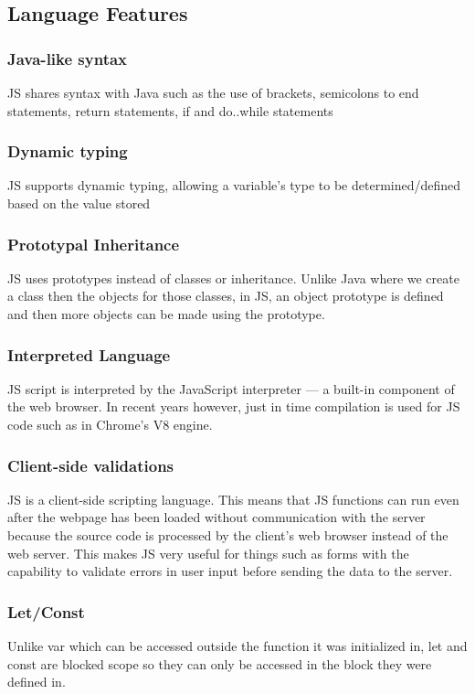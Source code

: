 \documentclass{article}
\begin{document}
  \subsection{Language Features}

  \subsubsection{Java-like syntax}
  JS shares syntax with Java such as the use of brackets, semicolons to end
  statements, return statements, if and do..while statements

  \subsubsection{Dynamic typing}
  JS supports dynamic typing, allowing a variable’s type to be
  determined/defined based on the value stored

  \subsubsection{Prototypal Inheritance}
  JS uses prototypes instead of classes or inheritance. Unlike Java where we
  create a class then the objects for those classes, in JS, an object prototype
  is defined and then more objects can be made using the prototype.

  \subsubsection{Interpreted Language}
  JS script is interpreted by the JavaScript interpreter --- a built-in
  component of the web browser. In recent years however, just in time
  compilation is used for JS code such as in Chrome’s V8 engine.

  \subsubsection{Client-side validations}
  JS is a client-side scripting language. This means that JS functions can run
  even after the webpage has been loaded without communication with the server
  because the source code is processed by the client’s web browser instead of
  the web server. This makes JS very useful for things such as forms with the
  capability to validate errors in user input before sending the data to the
  server.

  \subsubsection{Let/Const}
  Unlike var which can be accessed outside the function it was initialized in,
  let and const are blocked scope so they can only be accessed in the block they
  were defined in.
\end{document}
